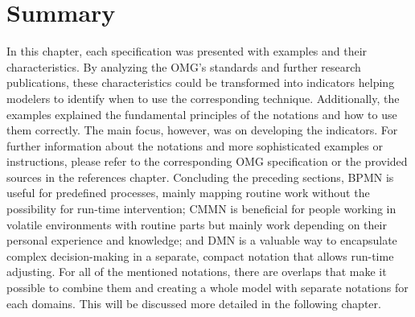 \section{Summary}
In this chapter, each specification was presented with examples and their characteristics. By analyzing the OMG's standards and further research publications, these characteristics could be transformed into indicators helping modelers to identify when to use the corresponding technique. Additionally, the examples explained the fundamental principles of the notations and how to use them correctly. The main focus, however, was on developing the indicators. For further information about the notations and more sophisticated examples or instructions, please refer to the corresponding OMG specification or the provided sources in the references chapter. 
Concluding the preceding sections, BPMN is useful for predefined processes, mainly mapping routine work without the possibility for run-time intervention; CMMN is beneficial for people working in volatile environments with routine parts but mainly work depending on their personal experience and knowledge; and DMN is a valuable way to encapsulate complex decision-making in a separate, compact notation that allows run-time adjusting. For all of the mentioned notations, there are overlaps that make it possible to combine them and creating a whole model with separate notations for each domains. This will be discussed more detailed in the following chapter.  

\listoftodos
